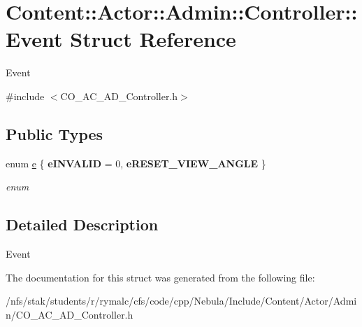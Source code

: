 \hypertarget{structContent_1_1Actor_1_1Admin_1_1Controller_1_1Event}{
\section{Content::Actor::Admin::Controller::Event Struct Reference}
\label{structContent_1_1Actor_1_1Admin_1_1Controller_1_1Event}
}


Event  


{\ttfamily \#include $<$CO\_\-AC\_\-AD\_\-Controller.h$>$}\subsection*{Public Types}
\begin{DoxyCompactItemize}
\item 
enum \hyperlink{structContent_1_1Actor_1_1Admin_1_1Controller_1_1Event_af8efa4beba3c7376271a7bc3095cb7ba}{e} \{ {\bfseries eINVALID} =  0, 
{\bfseries eRESET\_\-VIEW\_\-ANGLE}
 \}
\begin{DoxyCompactList}\small\item\em enum \item\end{DoxyCompactList}\end{DoxyCompactItemize}


\subsection{Detailed Description}
Event 

The documentation for this struct was generated from the following file:\begin{DoxyCompactItemize}
\item 
/nfs/stak/students/r/rymalc/cfs/code/cpp/Nebula/Include/Content/Actor/Admin/CO\_\-AC\_\-AD\_\-Controller.h\end{DoxyCompactItemize}
